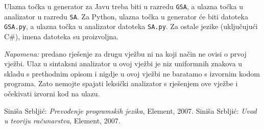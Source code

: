 \documentclass[times, 12pt, utf8]{book}
\begin{document}
Ulazna točka u generator za Javu treba biti u razredu \texttt{GSA}, a ulazna točka u analizator u razredu \texttt{SA}.
Za Python, ulazna točka u generator će biti datoteka \texttt{GSA.py}, a ulazna točka u analizator datoteka \texttt{SA.py}.
Za ostale jezike (uključujući C\#), imena datoteka su proizvoljna.

\emph{Napomena:} predano rješenje za drugu vježbu ni na koji način ne ovisi o prvoj vježbi. Ulaz u sintaksni analizator u ovoj vježbi je niz uniformnih znakova u skladu s prethodnim opisom i nigdje u ovoj vježbi ne baratamo s izvornim kodom programa. Zato nemojte spajati leksički analizator s rješenjem ove vježbe i očekivati izvorni kod na ulazu.

\newpage
{}
\begin{thebibliography}{10}
Siniša Srbljić:
\emph{Prevođenje programskih jezika}, Element, 2007.
Siniša Srbljić:
\emph{Uvod u teoriju računarstva}, Element, 2007.
\end{thebibliography}
\end{document}

